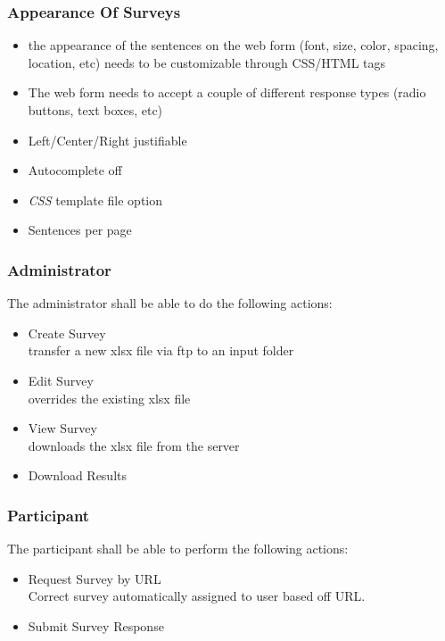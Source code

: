 \documentclass[a4paper,12pt,oneside]{report}
\begin{document}
\subsubsection { Appearance Of Surveys}

\begin{itemize} 
	\item  the appearance of the sentences on the web form (font, size, color, spacing, location, etc) needs to be customizable through CSS/HTML tags
	\item The web form needs to accept a couple of different response types (radio buttons, text boxes, etc)
	\item Left/Center/Right justifiable
	\item Autocomplete off
	\item \emph{CSS} template file option
	\item Sentences per page
\end{itemize}
\subsubsection{Administrator}
The administrator shall be able to do the following actions:
\begin{itemize}
	\item Create Survey \\ transfer a new xlsx file via ftp to an input folder
	\item Edit Survey \\ overrides the existing xlsx file
	\item View Survey \\ downloads the xlsx file from the server
	\item Download Results 
\end{itemize}

\subsubsection{Participant}
The participant shall be able to perform the following actions:
\begin{itemize}
	\item Request Survey by URL \\ Correct survey automatically assigned to user based off URL.
	\item Submit Survey Response
\end{itemize}
\end{document}
